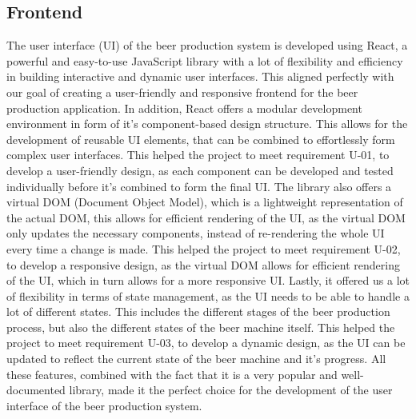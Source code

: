 \subsection{Frontend}
The user interface (UI) of the beer production system is developed using React, a powerful and easy-to-use JavaScript library with a lot of flexibility and efficiency in building interactive and dynamic user interfaces. This aligned perfectly with our goal of creating a user-friendly and responsive frontend for the beer production application.
In addition, React offers a modular development environment in form of it's component-based design structure. This allows for the development of reusable UI elements, that can be combined to effortlessly form complex user interfaces. This helped the project to meet requirement U-01, to develop a user-friendly design, as each component can be developed and tested individually before it's combined to form the final UI. \newline
The library also offers a virtual DOM (Document Object Model), which is a lightweight representation of the actual DOM, this allows for efficient rendering of the UI, as the virtual DOM only updates the necessary components, instead of re-rendering the whole UI every time a change is made. This helped the project to meet requirement U-02, to develop a responsive design, as the virtual DOM allows for efficient rendering of the UI, which in turn allows for a more responsive UI. \newline
Lastly, it offered us a lot of flexibility in terms of state management, as the UI needs to be able to handle a lot of different states. This includes the different stages of the beer production process, but also the different states of the beer machine itself. This helped the project to meet requirement U-03, to develop a dynamic design, as the UI can be updated to reflect the current state of the beer machine and it's progress. \newline
All these features, combined with the fact that it is a very popular and well-documented library, made it the perfect choice for the development of the user interface of the beer production system.
